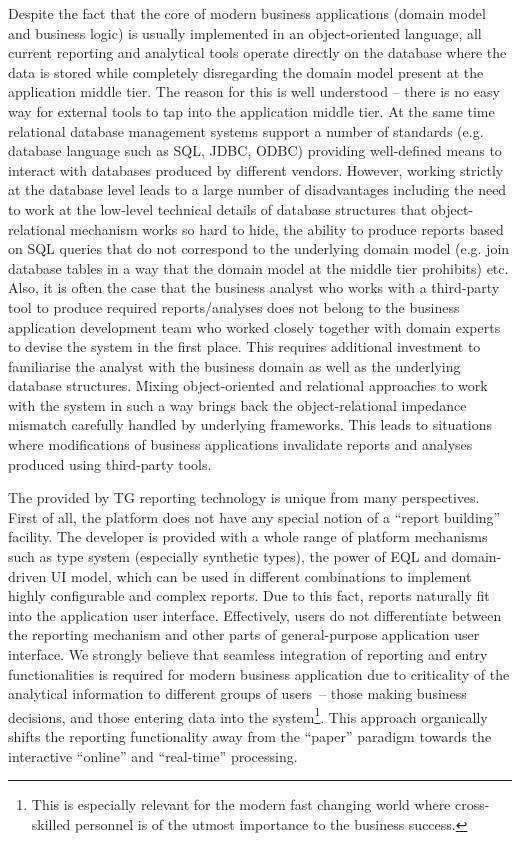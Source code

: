   Despite the fact that the core of modern business applications (domain model and business logic) is usually implemented in an object-oriented language, all current reporting and analytical tools operate directly on the database where the data is stored while completely disregarding the domain model present at the application middle tier.  
  The reason for this is well understood -- there is no easy way for external tools to tap into the application middle tier.
  At the same time relational database management systems support a number of standards (e.g. database language such as SQL, JDBC, ODBC) providing well-defined means to interact with databases produced by different vendors.
  However, working strictly at the database level leads to a large number of disadvantages including the need to work at the low-level technical details of database structures that object-relational mechanism works so hard to hide, the ability to produce reports based on SQL queries that do not correspond to the underlying domain model (e.g. join database tables in a way that the domain model at the middle tier prohibits) etc.
  Also, it is often the case that the business analyst who works with a third-party tool to produce required reports/analyses does not belong to the business application development team who worked closely together with domain experts to devise the system in the first place.
  This requires additional investment to familiarise the analyst with the business domain as well as the underlying database structures.
  Mixing object-oriented and relational approaches to work with the system in such a way brings back the object-relational impedance mismatch carefully handled by underlying frameworks.
  This leads to situations where modifications of business applications invalidate reports and analyses produced using third-party tools.

  The provided by TG reporting technology is unique from many perspectives.
  First of all, the platform does not have any special notion of a ``report building'' facility.
  The developer is provided with a whole range of platform mechanisms such as type system (especially synthetic types), the power of EQL and domain-driven UI model, which can be used in different combinations to implement highly configurable and complex reports.
  Due to this fact, reports naturally fit into the application user interface.
  Effectively, users do not differentiate between the reporting mechanism and other parts of general-purpose application user interface.
  We strongly believe that seamless integration of reporting and entry functionalities is required for modern business application due to criticality of the analytical information to different groups of users~-- those making business decisions, and those entering data into the system\footnote{This is especially relevant for the modern fast changing world where cross-skilled personnel is of the utmost importance to the business success.}.
  This approach organically shifts the reporting functionality away from  the ``paper'' paradigm towards the interactive ``online'' and ``real-time'' processing.
  
